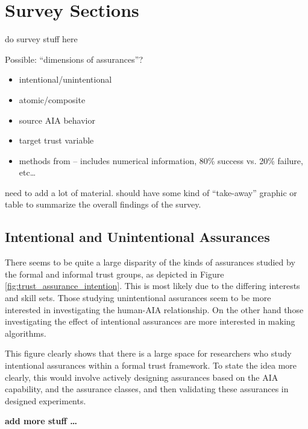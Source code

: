 \section{Survey Sections} \label{sec:survey}
do survey stuff here

Possible: ``dimensions of assurances''?

\begin{itemize}
    \item intentional/unintentional
    \item atomic/composite
    \item source AIA behavior
    \item target trust variable
    \item methods from \cite{Lacave2002-cu} -- includes numerical information, 80\% success vs. 20\% failure, etc\ldots
\end{itemize}

need to add a lot of material. should have some kind of ``take-away'' graphic or table to summarize the overall findings of the survey.

\subsection{Intentional and Unintentional Assurances}
    There seems to be quite a large disparity of the kinds of assurances studied by the formal and informal trust groups, as depicted in Figure \ref{fig:trust_assurance_intention}.  This is most likely due to the differing interests and skill sets. Those studying unintentional assurances seem to be more interested in investigating the human-AIA relationship. On the other hand those investigating the effect of intentional assurances are more interested in making algorithms.
    
    This figure clearly shows that there is a large space for researchers who study intentional assurances within a formal trust framework. To state the idea more clearly, this would involve actively designing assurances based on the AIA capability, and the assurance classes, and then validating these assurances in designed experiments.

    \textbf{add more stuff \ldots}

